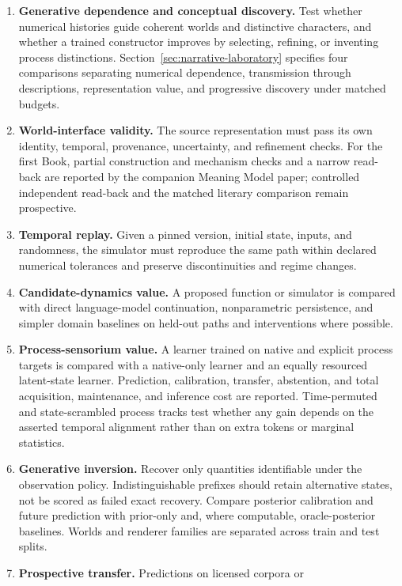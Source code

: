 \documentclass[10pt]{article}
\begin{document}
\begin{enumerate}
  \item \textbf{Generative dependence and conceptual discovery.} Test whether
    numerical histories guide coherent worlds and distinctive characters,
    and whether a trained constructor improves by selecting, refining, or
    inventing process distinctions. Section~\ref{sec:narrative-laboratory}
    specifies four comparisons separating numerical dependence, transmission
    through descriptions, representation value, and progressive discovery
    under matched budgets.
  \item \textbf{World-interface validity.} The source representation must pass
    its own identity, temporal, provenance, uncertainty, and refinement checks.
    For the first Book, partial construction and mechanism
    checks and a narrow read-back are reported by the companion Meaning Model
    paper; controlled independent read-back and the matched literary comparison
    remain prospective.
  \item \textbf{Temporal replay.} Given a pinned version, initial state, inputs,
    and randomness, the simulator must reproduce the same path within declared
    numerical tolerances and preserve discontinuities and regime changes.
  \item \textbf{Candidate-dynamics value.} A proposed function or simulator is
    compared with direct language-model continuation, nonparametric persistence,
    and simpler domain baselines on held-out paths and interventions where
    possible.
  \item \textbf{Process-sensorium value.} A learner trained on native and
    explicit process targets is compared with a native-only learner and an
    equally resourced latent-state learner. Prediction, calibration, transfer,
    abstention, and total acquisition, maintenance, and inference cost are
    reported. Time-permuted and state-scrambled process tracks test whether any
    gain depends on the asserted temporal alignment rather than on extra tokens
    or marginal statistics.
  \item \textbf{Generative inversion.} Recover only quantities identifiable
    under the observation policy. Indistinguishable prefixes should retain
    alternative states, not be scored as failed exact recovery. Compare
    posterior calibration and future prediction with prior-only and, where
    computable, oracle-posterior baselines. Worlds and renderer families are
    separated across train and test splits.
  \item \textbf{Prospective transfer.} Predictions on licensed corpora or

\end{enumerate}
\end{document}
